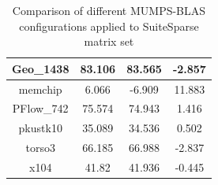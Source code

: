 \begin{table}[h!]
\begin{tabular}{|c|c|c|c|}
Geo\_1438                                             & 83.106                                                                                                  & 83.565                                                                                               & -2.857                                                                                                  \\ \hline
memchip                                               & 6.066                                                                                                   & -6.909                                                                                               & 11.883                                                                                                  \\ \hline
PFlow\_742                                            & 75.574                                                                                                  & 74.943                                                                                               & 1.416                                                                                                   \\ \hline
pkustk10                                              & 35.089                                                                                                  & 34.536                                                                                               & 0.502                                                                                                   \\ \hline
torso3                                                & 66.185                                                                                                  & 66.988                                                                                               & -2.837                                                                                                  \\ \hline
x104                                                  & 41.82                                                                                                   & 41.936                                                                                               & -0.445                                                                                                  \\ \hline
\end{tabular}
\caption{Comparison of different MUMPS-BLAS configurations applied to SuiteSparse matrix set}
\label{table:mumps-blas-performance-gain-suitesprase}
\end{table}


